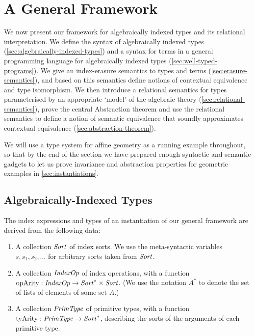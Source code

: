 \newcommand{\Gen}{\mathrm{Gen}}
\newcommand{\Free}{\mathrm{Free}}
\newcommand{\semSort}[1]{\llbracket #1 \rrbracket}
\newcommand{\semIndexExp}[1]{\llbracket #1 \rrbracket}
\newcommand{\semPrimType}[1]{\llbracket #1 \rrbracket}
\newcommand{\opsCtxt}{\Gamma_{\mathit{ops}}}
\newcommand{\opsEnv}{\eta_{\mathit{ops}}}
\newcommand{\ctxteq}[5]{{#1};{#2}\vdash{#3}\approx{#4}:{#5}}
\newcommand{\semeq}[5]{{#1};{#2}\models{#3}\sim{#4}:{#5}}
\section{A General Framework}
\label{sec:a-general-framework}

We now present our framework for algebraically indexed types and its
relational interpretation.  We define the syntax of algebraically
indexed types (\autoref{sec:algebraically-indexed-types}) and a syntax
for terms in a general programming language for algebraically indexed
types (\autoref{sec:well-typed-programs}). We give an index-erasure
semantics to types and terms (\autoref{sec:erasure-semantics}), and
based on this semantics define notions of contextual equivalence and
type isomorphism. We
then introduce a relational semantics for types parameterised by an appropriate
`model' of the algebraic theory (\autoref{sec:relational-semantics}),
prove the central Abstraction theorem
and use the relational semantics
to define a notion of semantic equivalence that soundly approximates 
contextual equivalence (\autoref{sec:abstraction-theorem}).

We will use a type system for affine geometry as a running example
throughout, so that by the end of the section we have prepared enough
syntactic and semantic gadgets to let us prove invariance
and abstraction properties for geometric examples in
\autoref{sec:instantiations}.

\subsection{Algebraically-Indexed Types}
\label{sec:algebraically-indexed-types}

The index expressions and types of an instantiation of our general
framework are derived from the following data:
\begin{enumerate}
\item A collection $\mathit{Sort}$ of index sorts. We use the
  meta-syntactic variables $s,s_1,s_2,\ldots$ for arbitrary sorts taken
  from $\mathit{Sort}$.
\item A collection $\mathit{IndexOp}$ of index operations, with a function
  $\mathrm{opArity} : \mathit{IndexOp} \to \mathit{Sort}^* \times \mathit{Sort}$. (We use
  the notation $A^*$ to denote the set of lists of elements of some
  set $A$.)
\item A collection $\mathit{PrimType}$ of primitive types, with a function
  $\mathrm{tyArity} : \mathit{PrimType} \to \mathit{Sort}^*$, describing the sorts
  of the arguments of each primitive type.
\end{enumerate}


